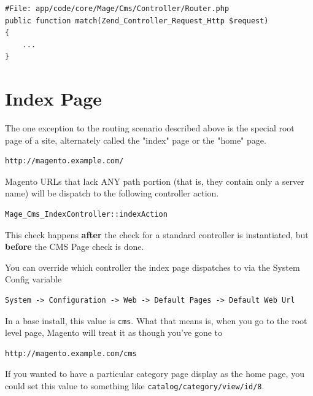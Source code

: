 \documentclass[oneside]{book}
\begin{document}
\begin{lstlisting}
#File: app/code/core/Mage/Cms/Controller/Router.php
public function match(Zend_Controller_Request_Http $request)
{
    ...
}   

\end{lstlisting}


\section{Index Page}

The one exception to the routing scenario described above is the special root page of a site, alternately called the "index" page or the "home" page.

\begin{lstlisting}
http://magento.example.com/

\end{lstlisting}


Magento URLs that lack ANY path portion (that is, they contain only a server name) will be dispatch to the following controller action. 

\begin{lstlisting}
Mage_Cms_IndexController::indexAction

\end{lstlisting}


This check happens \textbf{after} the check for a standard controller is instantiated, but \textbf{before} the CMS Page check is done. 

You can override which controller the index page dispatches to via the System Config variable

\begin{lstlisting}
System -> Configuration -> Web -> Default Pages -> Default Web Url

\end{lstlisting}


In a base install, this value is \footnotesize\texttt{cms}\normalsize.  What that means is, when you go to the root level page, Magento will treat it as though you've gone to  

\begin{lstlisting}
http://magento.example.com/cms

\end{lstlisting}


If you wanted to have a particular category page display as the home page, you could set this value to something like \footnotesize\texttt{catalog/category/view/id/8}\normalsize.
\end{document}

